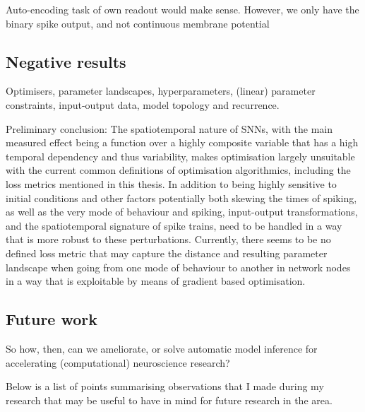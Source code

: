 \documentclass[mphil,deptreport,ianc]{infthesis} %
\begin{document}
Auto-encoding task of own readout would make sense. However, we only have the binary spike output, and not continuous membrane potential


\subsection{Negative results}

Optimisers, parameter landscapes, hyperparameters, (linear) parameter constraints, input-output data, model topology and recurrence.

Preliminary conclusion: The spatiotemporal nature of SNNs, with the main measured effect being a function over a highly composite variable that has a high temporal dependency and thus variability, makes optimisation largely unsuitable with the current common definitions of optimisation algorithmics, including the loss metrics mentioned in this thesis.
In addition to being highly sensitive to initial conditions and other factors potentially both skewing the times of spiking, as well as the very mode of behaviour and spiking, input-output transformations, and the spatiotemporal signature of spike trains, need to be handled in a way that is more robust to these perturbations. 
Currently, there seems to be no defined loss metric that may capture the distance and resulting parameter landscape when going from one mode of behaviour to another in network nodes in a way that is exploitable by means of gradient based optimisation.

\subsection{Future work}

So how, then, can we ameliorate, or solve automatic model inference for accelerating (computational) neuroscience research?

Below is a list of points summarising observations that I made during my research that may be useful to have in mind for future research in the area.
\end{document}
